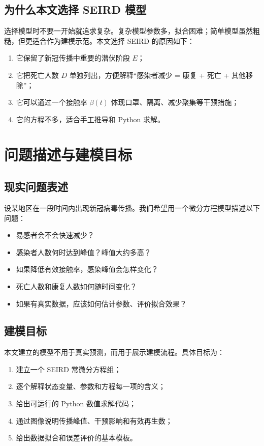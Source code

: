 \documentclass[UTF8,12pt,a4paper]{ctexart}
\begin{document}
\subsection{为什么本文选择 SEIRD 模型}
选择模型时不要一开始就追求复杂。复杂模型参数多，拟合困难；简单模型虽然粗糙，但更适合作为建模示范。本文选择 SEIRD 的原因如下：
\begin{enumerate}[label=\arabic*.]
\item 它保留了新冠传播中重要的潜伏阶段 $E$；
\item 它把死亡人数 $D$ 单独列出，方便解释“感染者减少 = 康复 + 死亡 + 其他移除”；
\item 它可以通过一个接触率 $\beta(t)$ 体现口罩、隔离、减少聚集等干预措施；
\item 它的方程不多，适合手工推导和 Python 求解。
\end{enumerate}

\section{问题描述与建模目标}
\subsection{现实问题表述}
设某地区在一段时间内出现新冠病毒传播。我们希望用一个微分方程模型描述以下问题：
\begin{itemize}
\item 易感者会不会快速减少？
\item 感染者人数何时达到峰值？峰值大约多高？
\item 如果降低有效接触率，感染峰值会怎样变化？
\item 死亡人数和康复人数如何随时间变化？
\item 如果有真实数据，应该如何估计参数、评价拟合效果？
\end{itemize}

\subsection{建模目标}
本文建立的模型不用于真实预测，而用于展示建模流程。具体目标为：
\begin{enumerate}[label=\arabic*.]
\item 建立一个 SEIRD 常微分方程组；
\item 逐个解释状态变量、参数和方程每一项的含义；
\item 给出可运行的 Python 数值求解代码；
\item 通过图像说明传播峰值、干预影响和有效再生数；
\item 给出数据拟合和误差评价的基本模板。
\end{enumerate}
\end{document}
